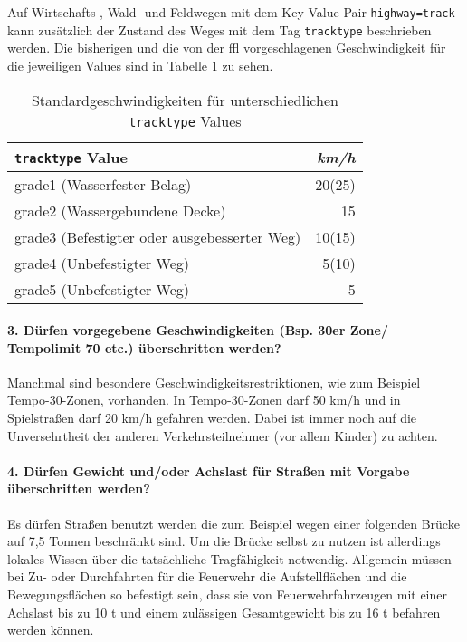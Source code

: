 Auf Wirtschafts-, Wald- und Feldwegen mit dem Key-Value-Pair \texttt{highway=track} kann zusätzlich der Zustand des Weges mit dem Tag \texttt{tracktype} beschrieben werden.
Die bisherigen und die von der \gls{ffl} vorgeschlagenen Geschwindigkeit für die jeweiligen Values sind in Tabelle \ref{tab:speedinfotrack} zu sehen.

\begin{table}[h]
\centering
\caption{Standardgeschwindigkeiten für unterschiedlichen \texttt{tracktype} Values}
\label{tab:speedinfotrack}
\begin{tabular}{|l|r|}
\hline
\texttt{tracktype} Value & \textit{km/h} \\
\hline
grade1 (Wasserfester Belag) & 20(25)   \\
grade2 (Wassergebundene Decke) & 15  \\
grade3 (Befestigter oder ausgebesserter Weg) & 10(15)  \\
grade4 (Unbefestigter Weg) & 5(10)   \\
grade5 (Unbefestigter Weg) & 5   \\
\hline
\end{tabular}
\end{table}

\paragraph*{3. Dürfen vorgegebene Geschwindigkeiten (Bsp. 30er Zone/ Tempolimit 70 etc.) überschritten werden?}
\label{frage3}
\par
Manchmal sind besondere Geschwindigkeitsrestriktionen, wie zum Beispiel Tempo-30-Zonen, vorhanden.
In Tempo-30-Zonen darf 50 km/h und in Spielstraßen darf 20 km/h gefahren werden.
Dabei ist immer noch auf die Unversehrtheit der anderen Verkehrsteilnehmer (vor allem Kinder) zu achten.

\paragraph*{4. Dürfen Gewicht und/oder Achslast für Straßen mit Vorgabe überschritten werden?}
\label{frage4}
\par
Es dürfen Straßen benutzt werden die zum Beispiel wegen einer folgenden Brücke auf 7,5 Tonnen beschränkt sind.
Um die Brücke selbst zu nutzen ist allerdings lokales Wissen über die tatsächliche Tragfähigkeit notwendig.
Allgemein müssen bei Zu- oder Durchfahrten für die Feuerwehr die Aufstellflächen und die Bewegungsflächen so befestigt sein, dass sie von Feuerwehrfahrzeugen mit einer Achslast bis zu 10 t und einem zulässigen Gesamtgewicht bis zu 16 t befahren werden können.

